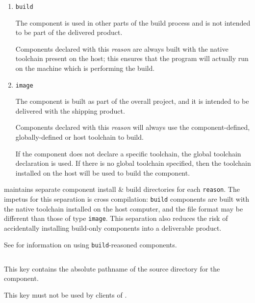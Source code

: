   \begin{enumerate}
  \item \texttt{build}

    The component is used in other parts of the build process and is
    not intended to be part of the delivered product.

    Components declared with this \emph{reason} are always built with
    the native toolchain present on the host; this ensures that the
    program will actually run on the machine which is performing the
    build.

  \item \texttt{image}

    The component is built as part of the overall project, and it is
    intended to be delivered with the shipping product.

    Components declared with this \emph{reason} will always use the
    component-defined, globally-defined or host toolchain to build.

    If the component does not declare a specific toolchain, the global
    toolchain declaration is used.  If there is no global toolchain
    specified, then the toolchain installed on the host will be used
    to build the component.

  \end{enumerate}

  \lmsbw maintains separate component install \& build directories for
  each \texttt{reason}.  The impetus for this separation is cross
  compilation: \texttt{build} components are built with the native
  toolchain installed on the host computer, and the file format may be
  different than those of type \texttt{image}.  This separation also
  reduces the risk of accidentally installing build-only components
  into a deliverable product.

  See  for information on using
  \texttt{build}-reasoned components.


\subsection{}\label{variables:source-directory}

This key contains the absolute pathname of the source directory for
the component.

This key must not be used by clients of \lmsbw.

